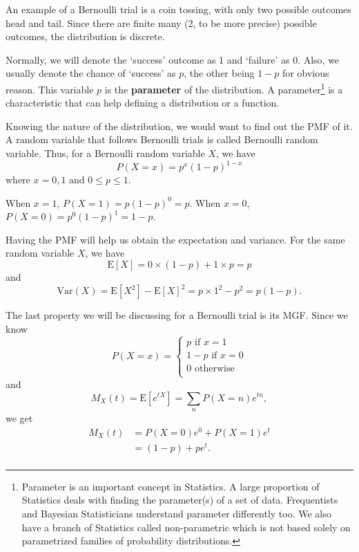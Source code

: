 \documentclass[11pt, a4paper, oneside]{book}
\theoremstyle{definition}
\newcommand{\var}[1]{\text{Var}(#1)}
\newcommand{\E}[1]{\text{E}[#1]}
\begin{document}
\noindent An example of a Bernoulli trial is a coin tossing, with only two possible outcomes head and tail. Since there are finite many (2, to be more precise) possible outcomes, the distribution is discrete.

\noindent Normally, we will denote the `success' outcome as 1 and `failure' as 0. Also, we usually denote the chance of `success' as $p$, the other being $1-p$ for obvious reason. This variable $p$ is the \textbf{parameter} of the distribution. A parameter\footnote{Parameter is an important concept in Statistics. A large proportion of Statistics deals with finding the parameter(s) of a set of data. Frequentists and Bayesian Statisticians understand parameter differently too. We also have a branch of Statistics called non-parametric which is not based solely on parametrized families of probability distributions.} is a characteristic that can help defining a distribution or a function.  

\noindent Knowing the nature of the distribution, we would want to find out the PMF of it. A random variable that follows Bernoulli trials is called Bernoulli random variable. Thus, for a Bernoulli random variable $X$, we have\[
P(X = x) = p^x(1-p)^{1-x}
\]
where $x = 0, 1$ and $0 \le p \le 1$.

\noindent When $x=1$, $P(X = 1) = p(1-p)^{0}=p$. When $x=0$, $P(X = 0) = p^0(1-p)^{1}=1-p$. 

\noindent Having the PMF will help us obtain the expectation and variance. For the same random variable $X$, we have\[
\E{X} = 0 \times (1-p) + 1 \times p = p
\]
and \[
\var{X} = \E{X^2} - {\E{X}}^2 = p\times 1^2 - p^2 = p(1-p). 
\]

\noindent The last property we will be discussing for a Bernoulli trial is its MGF. Since we know
\begin{equation*}
P(X=x) = 
\begin{cases} 
      p \text{ if } x=1 \\
      1-p \text{ if } x=0 \\
      0 \text{ otherwise}\\
\end{cases}
\end{equation*}
and \[
M_X(t) = \E{e^{tX}} = \sum_{n} P(X=n)e^{tn},
\]
we get
\begin{equation*}
\begin{split}
M_X(t) &= P(X=0)e^{0} + P(X=1)e^{t} \\
&= (1-p) + pe^t. \\
\end{split}
\end{equation*}
\end{document}
